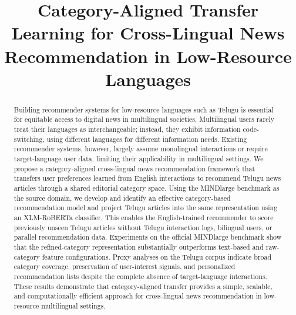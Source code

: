 \documentclass[conference]{IEEEtran}
\begin{document}
\title{Category-Aligned Transfer Learning for Cross-Lingual News Recommendation in Low-Resource Languages}





\maketitle

\begin{abstract}
Building recommender systems for low-resource languages such as Telugu is essential for equitable access to digital news in multilingual societies. Multilingual users rarely treat their languages as interchangeable; instead, they exhibit information code-switching, using different languages for different information needs. Existing recommender systems, however, largely assume monolingual interactions or require target-language user data, limiting their applicability in multilingual settings.
We propose a category-aligned cross-lingual news recommendation framework that transfers user preferences learned from English interactions to recommend Telugu news articles through a shared editorial category space. Using the MINDlarge benchmark as the source domain, we develop and identify an effective category-based recommendation model and project Telugu articles into the same representation using an XLM-RoBERTa classifier. This enables the English-trained recommender to score previously unseen Telugu articles without Telugu interaction logs, bilingual users, or parallel recommendation data.
Experiments on the official MINDlarge benchmark show that the refined-category representation substantially outperforms text-based and raw-category feature configurations. Proxy analyses on the Telugu corpus indicate broad category coverage, preservation of user-interest signals, and personalized recommendation lists despite the complete absence of target-language interactions. These results demonstrate that category-aligned transfer provides a simple, scalable, and computationally efficient approach for cross-lingual news recommendation in low-resource multilingual settings.

\end{abstract}
\end{document}
